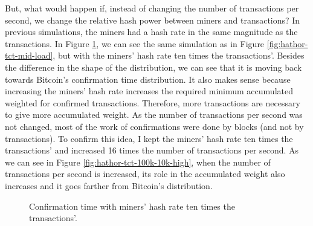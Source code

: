 But, what would happen if, instead of changing the number of transactions per second, we change the relative hash power between miners and transactions? In previous simulations, the miners had a hash rate in the same magnitude as the transactions. In Figure \ref{fig:hathor-tct-100k-10k}, we can see the same simulation as in Figure \ref{fig:hathor-tct-mid-load}, but with the miners' hash rate ten times the transactions'. Besides the difference in the shape of the distribution, we can see that it is moving back towards Bitcoin's confirmation time distribution. It also makes sense because increasing the miners' hash rate increases the required minimum accumulated weighted for confirmed transactions. Therefore, more transactions are necessary to give more accumulated weight. As the number of transactions per second was not changed, most of the work of confirmations were done by blocks (and not by transactions). To confirm this idea, I kept the miners' hash rate ten times the transactions' and increased 16 times the number of transactions per second. As we can see in Figure \ref{fig:hathor-tct-100k-10k-high}, when the number of transactions per second is increased, its role in the accumulated weight also increases and it goes farther from Bitcoin's distribution.

\begin{figure}[!htb]
\centering
{}

\caption{Confirmation time with miners' hash rate ten times the transactions'. \label{fig:hathor-tct-100k-10k}}
\end{figure}

